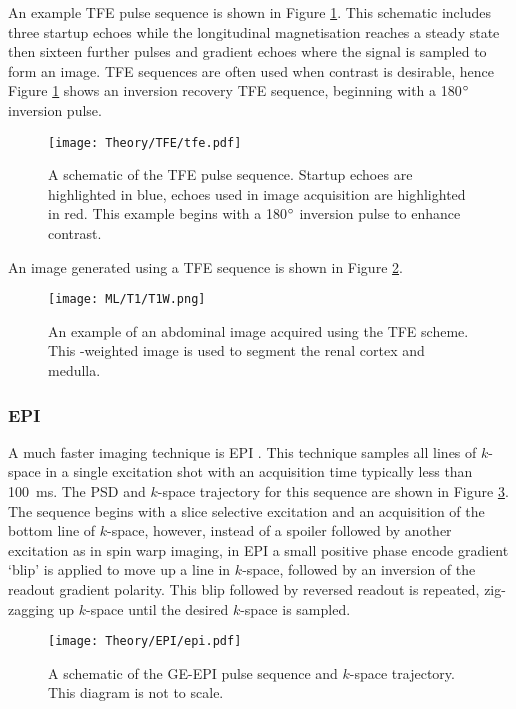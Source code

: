 An example \ac{TFE} pulse sequence is shown in Figure \ref{fig:theory_tfe_psd}. This schematic includes three startup echoes while the longitudinal magnetisation reaches a steady state then sixteen further pulses and gradient echoes where the signal is sampled to form an image. \ac{TFE} sequences are often used when \tone contrast is desirable, hence Figure \ref{fig:theory_tfe_psd} shows an inversion recovery \ac{TFE} sequence, beginning with a 180$\degree$ inversion pulse.

\begin{figure}[H]
	\centering
	\texttt{[image: Theory/TFE/tfe.pdf]}
	\caption{A schematic of the \ac{TFE} pulse sequence. Startup echoes are highlighted in blue, echoes used in image acquisition are highlighted in red. This example begins with a 180$\degree$ inversion pulse to enhance \tone contrast.}
	\label{fig:theory_tfe_psd}
\end{figure}
An image generated using a \ac{TFE} sequence is shown in Figure \ref{fig:theory_tfe_example}.
\begin{figure}[H]
	\centering
	\texttt{[image: ML/T1/T1W.png]}
	\caption{An example of an abdominal image acquired using the \ac{TFE} scheme. This \tone-weighted image is used to segment the renal cortex and medulla.}
	\label{fig:theory_tfe_example}	
\end{figure}

\subsubsection{\ac*{EPI}}
A much faster imaging technique is \ac{EPI} \cite{mansfield_nmr_1973}. This technique samples all lines of $k$-space in a single excitation shot with an acquisition time typically less than 100~ms. The \ac{PSD} and $k$-space trajectory for this sequence are shown in Figure \ref{fig:theory_epi}. The sequence begins with a slice selective excitation and an acquisition of the bottom line of $k$-space, however, instead of a spoiler followed by another excitation as in spin warp imaging, in \ac{EPI} a small positive phase encode gradient `blip' is applied to move up a line in $k$-space, followed by an inversion of the readout gradient polarity. This blip followed by reversed readout is repeated, zig-zagging up $k$-space until the desired $k$-space is sampled.

\begin{figure}[H]
	\centering
	\texttt{[image: Theory/EPI/epi.pdf]}
	\caption{A schematic of the \ac{GE}-\ac{EPI} pulse sequence and $k$-space trajectory. This diagram is not to scale.}
	\label{fig:theory_epi}	
\end{figure}

